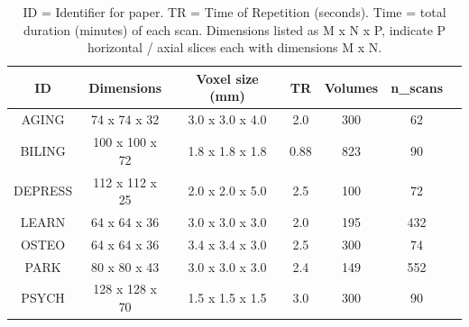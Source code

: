 \documentclass[12pt]{spieman}  %
\begin{document}
\begin{spacing}{2}
\begin{table}[h!]
\small
\centering
\begin{tabular}{ c c c c c c c }
\hline
\textbf{ID}    & \textbf{Dimensions}  & \textbf{Voxel size (mm)} & \textbf{TR} & \textbf{Volumes} & \textbf{n\_scans} \\
\hline
AGING     & 74 x 74 x 32   & 3.0 x 3.0 x 4.0 & 2.0  & 300 & 62  \\
BILING    & 100 x 100 x 72 & 1.8 x 1.8 x 1.8 & 0.88 & 823 & 90  \\
DEPRESS   & 112 x 112 x 25 & 2.0 x 2.0 x 5.0 & 2.5  & 100 & 72  \\
LEARN     & 64 x 64 x 36   & 3.0 x 3.0 x 3.0 & 2.0  & 195 & 432 \\
OSTEO     & 64 x 64 x 36   & 3.4 x 3.4 x 3.0 & 2.5  & 300 & 74  \\
PARK      & 80 x 80 x 43   & 3.0 x 3.0 x 3.0 & 2.4  & 149 & 552 \\
PSYCH     & 128 x 128 x 70 & 1.5 x 1.5 x 1.5 & 3.0  & 300 & 90  \\
\hline
\end{tabular}
\caption{
    ID = Identifier for paper. TR = Time of Repetition (seconds).
    Time = total duration (minutes) of each scan. Dimensions listed as M x N x P,
    indicate P horizontal / axial slices each with dimensions M x N.
}
\label{table:1}
\end{table}


\end{spacing}
\end{document}
